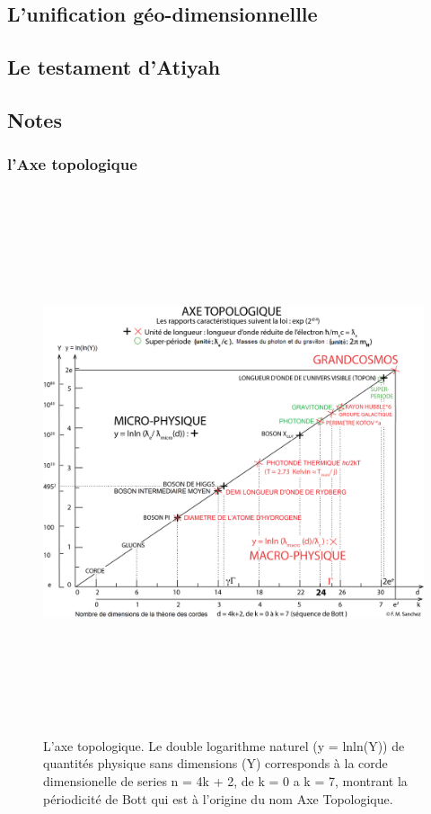\documentclass[a4paper,12pt]{article}
\begin{document}
\subsection{L'unification géo-dimensionnellle}
\subsection{Le testament d'Atiyah}




\subsection{Notes}
\subsubsection{l'Axe topologique}

\begin{figure}
\centering
\includegraphics[width=15cm,height=16cm]{./figures/figure.png}
\caption[Axe Topologique]{L'axe topologique. Le double logarithme naturel (y = lnln(Y)) de quantités physique sans dimensions (Y) corresponds à la corde dimensionelle de series n = 4k + 2, de k = 0 a k = 7, montrant la périodicité de Bott qui est à l'origine du nom Axe Topologique.}
\label{fig:2:figure2}
\end{figure}
\end{document}
